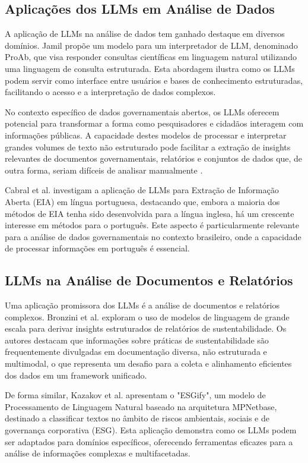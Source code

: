 \subsection{Aplicações dos LLMs em Análise de Dados}

A aplicação de LLMs na análise de dados tem ganhado destaque em diversos domínios. Jamil \cite{Jamil2024} propõe um modelo para um interpretador de LLM, denominado ProAb, que visa responder consultas científicas em linguagem natural utilizando uma linguagem de consulta estruturada. Esta abordagem ilustra como os LLMs podem servir como interface entre usuários e bases de conhecimento estruturadas, facilitando o acesso e a interpretação de dados complexos.

No contexto específico de dados governamentais abertos, os LLMs oferecem potencial para transformar a forma como pesquisadores e cidadãos interagem com informações públicas. A capacidade destes modelos de processar e interpretar grandes volumes de texto não estruturado pode facilitar a extração de insights relevantes de documentos governamentais, relatórios e conjuntos de dados que, de outra forma, seriam difíceis de analisar manualmente \cite{ref_38}.

Cabral et al. \cite{ref_38} investigam a aplicação de LLMs para Extração de Informação Aberta (EIA) em língua portuguesa, destacando que, embora a maioria dos métodos de EIA tenha sido desenvolvida para a língua inglesa, há um crescente interesse em métodos para o português. Este aspecto é particularmente relevante para a análise de dados governamentais no contexto brasileiro, onde a capacidade de processar informações em português é essencial.

\subsection{LLMs na Análise de Documentos e Relatórios}

Uma aplicação promissora dos LLMs é a análise de documentos e relatórios complexos. Bronzini et al. \cite{Bronzini2024} exploram o uso de modelos de linguagem de grande escala para derivar insights estruturados de relatórios de sustentabilidade. Os autores destacam que informações sobre práticas de sustentabilidade são frequentemente divulgadas em documentação diversa, não estruturada e multimodal, o que representa um desafio para a coleta e alinhamento eficientes dos dados em um framework unificado.

De forma similar, Kazakov et al. \cite{Kazakov2023} apresentam o "ESGify", um modelo de Processamento de Linguagem Natural baseado na arquitetura MPNetbase, destinado a classificar textos no âmbito de riscos ambientais, sociais e de governança corporativa (ESG). Esta aplicação demonstra como os LLMs podem ser adaptados para domínios específicos, oferecendo ferramentas eficazes para a análise de informações complexas e multifacetadas.

